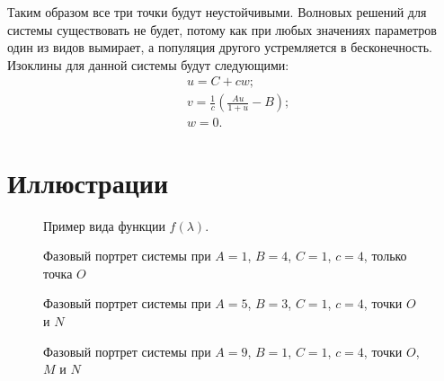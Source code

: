 \documentclass{article}
\begin{document}
Таким образом все три точки будут неустойчивыми. Волновых решений для системы существовать не будет, потому как при любых значениях параметров один из видов вымирает, а популяция другого устремляется в бесконечность. Изоклины для данной системы будут следующими:
\begin{equation*}
\begin{aligned}
&u = C + cw;\\
&v = \frac{1}{c} \left(\frac{Au}{1+u} - B\right);\\
&w = 0.
\end{aligned}
\end{equation*}

\section{Иллюстрации}
 \begin{figure}[h!]
\begin{center}
\caption{Пример вида функции $f(\lambda)$.}
\label{fig_5}
\end{center}
\end{figure}

 \begin{figure}[h!]
\begin{center}
\caption{Фазовый портрет системы при $A=1$, $B=4$, $C = 1$, $c=4$, только точка $O$}
\label{fig_6}
\end{center}
\end{figure}

 \begin{figure}[h!]
\begin{center}
\caption{Фазовый портрет системы при $A=5$, $B=3$, $C = 1$, $c=4$, точки $O$ и $N$}
\label{fig_7}
\end{center}
\end{figure}

 \begin{figure}[h!]
\begin{center}
\caption{Фазовый портрет системы при $A=9$, $B=1$, $C = 1$, $c=4$, точки $O$, $M$ и $N$}
\label{fig_8}
\end{center}
\end{figure}
\end{document}
